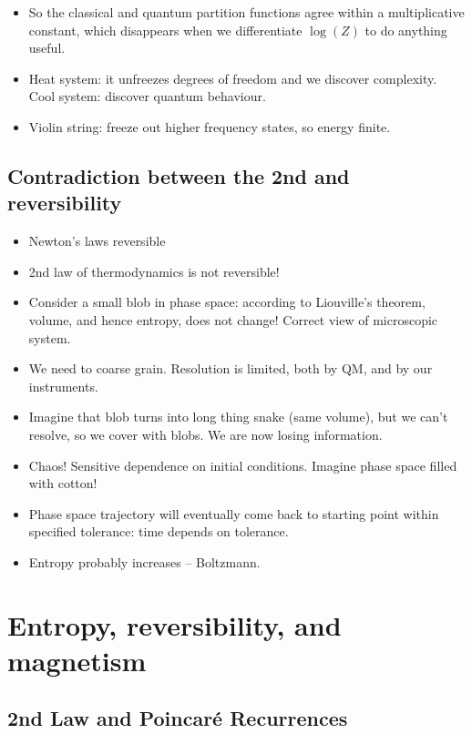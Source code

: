 \documentclass[]{article}
\begin{document}
\begin{itemize}
	\item So the classical and quantum partition functions agree within a multiplicative constant, which disappears when we differentiate $\log(Z)$ to do anything useful.
	\item Heat system: it unfreezes degrees of freedom and we discover complexity. Cool system: discover quantum behaviour.
	\item Violin string: freeze out higher frequency states, so energy finite.
\end{itemize}

\subsection{Contradiction between the 2nd and reversibility}
\begin{itemize}
	\item Newton's laws reversible
	\item 2nd law of thermodynamics is not reversible!
	\item Consider a small blob in phase space: according to Liouville's theorem, volume, and hence entropy, does not change! Correct view of microscopic system.
	\item We need to coarse grain. Resolution is limited, both by QM, and by our instruments.
	\item Imagine that blob turns into long thing snake (same volume), but we can't resolve, so we cover with blobs. We are now losing information. 
	\item Chaos! Sensitive dependence on initial conditions. Imagine phase space filled with cotton!
	
	\item Phase space trajectory will eventually come back to starting point within specified tolerance: time depends on tolerance.
	
	\item Entropy probably increases -- Boltzmann. 
\end{itemize}


\section{Entropy, reversibility, and magnetism}

\subsection{2nd Law and Poincar\'e Recurrences}
\end{document}
